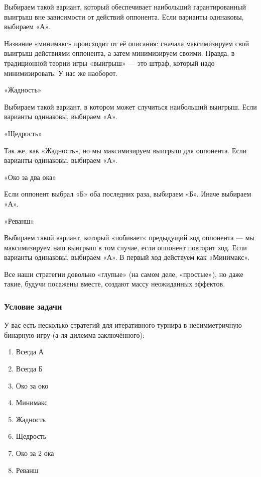 Выбираем такой вариант, который обеспечивает наибольший гарантированный выигрыш вне зависимости от действий оппонента. Если варианты одинаковы, выбираем «А». 

Название «минимакс» происходит от её описания: сначала максимизируем свой выигрыш действиями оппонента, а затем минимизируем своими. Правда, в традиционной теории игры «выигрыш» — это штраф, который надо минимизировать. У нас же наоборот.

«Жадность»

Выбираем такой вариант, в котором может случиться наибольший выигрыш. Если варианты одинаковы, выбираем «А».

«Щедрость»

Так же, как «Жадность», но мы максимизируем выигрыш для оппонента. Если варианты одинаковы, выбираем «А». 

«Око за два ока»

Если оппонент выбрал «Б» оба последних раза, выбираем «Б». Иначе \linebreak выбираем «А».

«Реванш»

Выбираем такой вариант, который «побивает« предыдущий ход оппонента — мы максимизируем наш выигрыш в том случае, если оппонент повторит ход. Если варианты одинаковы, выбираем «А». В первый ход действуем как «Минимакс».

Все наши стратегии довольно «глупые» (на самом деле, «простые»), но даже такие, будучи посажены вместе, создают массу неожиданных эффектов.

\subsubsection{Условие задачи}

У вас есть несколько стратегий для итеративного турнира в несимметричную бинарную игру (а-ля дилемма заключённого):

\begin{enumerate}
    \item Всегда А
    \item Всегда Б
    \item Око за око
    \item Минимакс
    \item Жадность
    \item Щедрость
    \item Око за 2 ока
    \item Реванш
\end{enumerate}

